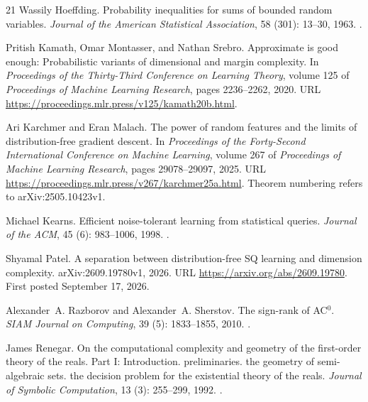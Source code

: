 \documentclass[11pt,letterpaper,pmlr,twoside]{jmlr}
\begin{document}
\begin{thebibliography}{21}
Wassily Hoeffding.
\newblock Probability inequalities for sums of bounded random variables.
\newblock \emph{Journal of the American Statistical Association}, 58
  (301): 13--30, 1963.
\newblock {}.

Pritish Kamath, Omar Montasser, and Nathan Srebro.
\newblock Approximate is good enough: Probabilistic variants of dimensional and
  margin complexity.
\newblock In \emph{Proceedings of the Thirty-Third Conference on Learning
  Theory}, volume 125 of \emph{Proceedings of Machine Learning Research}, pages
  2236--2262, 2020.
\newblock URL \url{https://proceedings.mlr.press/v125/kamath20b.html}.

Ari Karchmer and Eran Malach.
\newblock The power of random features and the limits of distribution-free
  gradient descent.
\newblock In \emph{Proceedings of the Forty-Second International Conference on
  Machine Learning}, volume 267 of \emph{Proceedings of Machine Learning
  Research}, pages 29078--29097, 2025.
\newblock URL \url{https://proceedings.mlr.press/v267/karchmer25a.html}.
\newblock Theorem numbering refers to arXiv:2505.10423v1.

Michael Kearns.
\newblock Efficient noise-tolerant learning from statistical queries.
\newblock \emph{Journal of the ACM}, 45 (6): 983--1006, 1998.
\newblock {}.

Shyamal Patel.
\newblock A separation between distribution-free {SQ} learning and dimension
  complexity.
\newblock arXiv:2609.19780v1, 2026.
\newblock URL \url{https://arxiv.org/abs/2609.19780}.
\newblock First posted September 17, 2026.

Alexander~A. Razborov and Alexander~A. Sherstov.
\newblock The sign-rank of {AC}$^0$.
\newblock \emph{SIAM Journal on Computing}, 39 (5):
  1833--1855, 2010.
\newblock {}.

James Renegar.
\newblock On the computational complexity and geometry of the first-order
  theory of the reals. {Part I}: Introduction. preliminaries. the geometry of
  semi-algebraic sets. the decision problem for the existential theory of the
  reals.
\newblock \emph{Journal of Symbolic Computation}, 13 (3):
  255--299, 1992{}.
\newblock {}.


\end{thebibliography}
\end{document}
